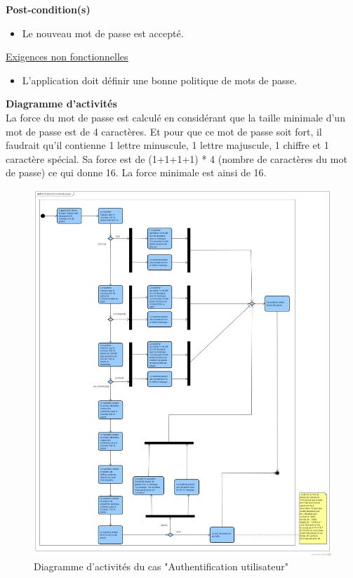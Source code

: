 \textbf{Post-condition(s)}
\begin{itemize}
	\item Le nouveau mot de passe est accepté.
\end{itemize}
\underline{\underline{Exigences non fonctionnelles}}
\begin{itemize}
	\item L’application doit définir une bonne politique de mots de passe.\\
\end{itemize}
\textbf{\RIGHTarrow Diagramme d'activités}\\
La force du mot de passe est calculé en considérant que la taille minimale d'un mot de passe est de 4 caractères. Et pour que ce mot de passe soit fort, il faudrait qu'il contienne 1 lettre minuscule, 1 lettre majuscule, 1 chiffre et 1 caractère spécial. Sa force est de (1+1+1+1) * 4 (nombre de caractères du mot de passe) ce qui donne 16. La force minimale est ainsi de 16.
\begin{figure}[H]
	\centering
	\includegraphics[width=1.0\textwidth,height=0.95\textheight]{fig/Verification-force-mot-de-passe-activity-diagram.png}
	\caption{Diagramme d'activités du cas "Authentification utilisateur"}
\end{figure}

